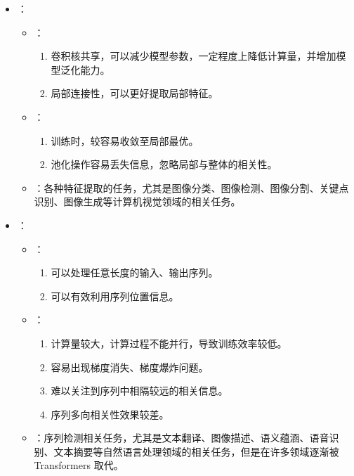\documentclass[a4paper]{article}
\begin{document}
    \begin{itemize}
        \item {}：
        \begin{itemize}
            \item {}：
            \begin{enumerate}
                \item 卷积核共享，可以减少模型参数，一定程度上降低计算量，并增加模型泛化能力。
                \item 局部连接性，可以更好提取局部特征。
            \end{enumerate}
            \item {}：
            \begin{enumerate}
                \item 训练时，较容易收敛至局部最优。
                \item 池化操作容易丢失信息，忽略局部与整体的相关性。
            \end{enumerate}
            \item {}：各种特征提取的任务，尤其是图像分类、图像检测、图像分割、关键点识别、图像生成等计算机视觉领域的相关任务。
        \end{itemize}
        \item {}：
        \begin{itemize}
            \item {}：
            \begin{enumerate}
                \item 可以处理任意长度的输入、输出序列。
                \item 可以有效利用序列位置信息。
            \end{enumerate}
            \item {}：
            \begin{enumerate}
                \item 计算量较大，计算过程不能并行，导致训练效率较低。
                \item 容易出现梯度消失、梯度爆炸问题。
                \item 难以关注到序列中相隔较远的相关信息。
                \item 序列多向相关性效果较差。
            \end{enumerate}
            \item {}：序列检测相关任务，尤其是文本翻译、图像描述、语义蕴涵、语音识别、文本摘要等自然语言处理领域的相关任务，但是在许多领域逐渐被 Transformers 取代。

\end{itemize}
\end{itemize}
\end{document}
